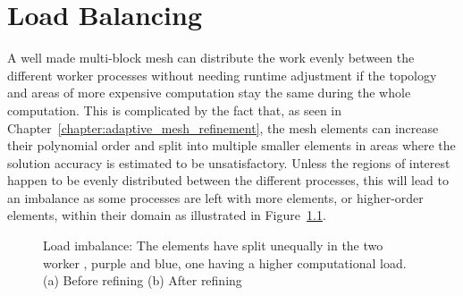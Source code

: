 \chapter{Load Balancing}\label{chapter:load_balancing}

A well made multi-block mesh can distribute the work evenly between the different worker processes
without needing runtime adjustment if the topology and areas of more expensive computation stay the
same during the whole computation. This is complicated by the fact that, as seen in
Chapter~\ref{chapter:adaptive_mesh_refinement}, the mesh elements can increase their polynomial
order and split into multiple smaller elements in areas where the solution accuracy is estimated to
be unsatisfactory. Unless the regions of interest happen to be evenly distributed between the
different processes, this will lead to an imbalance as some processes are left with more elements,
or higher-order elements, within their domain as illustrated in Figure~\ref{fig:load_imbalance_lb}.

\begin{figure}[H]
    \centering
    \hfill
    \caption{Load imbalance: The elements have split unequally in the two worker
        ,  purple and blue, one having a higher computational load. (a) Before
        refining (b) After refining}\label{fig:load_imbalance_lb}
\end{figure}

